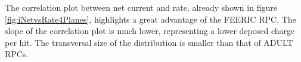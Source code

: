 The correlation plot between net current and rate, already shown in figure \ref{fig:iNetvsRate4Planes}, highlights a great advantage of the FEERIC RPC.
The slope of the correlation plot is much lower, representing a lower deposed charge per hit.
The transversal size of the distribution is smaller than that of ADULT RPCs.






